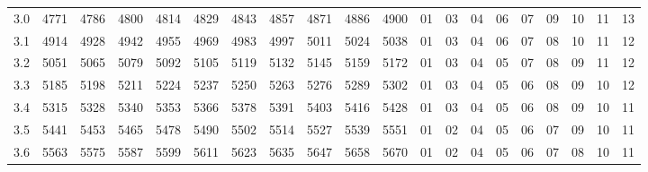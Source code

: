 \documentclass[12pt,UTF8]{ctexbook}
\begin{document}
\begin{appendix}
\begin{longtable}{|c| c c c c c | c c c c c| c c c c c c c c c|}
\scriptsize 3.0 & \scriptsize 4771 & \scriptsize 4786 & \scriptsize 4800 & \scriptsize 4814 & \scriptsize 4829 & \scriptsize 4843 & \scriptsize 4857 & \scriptsize 4871 & \scriptsize 4886 & \scriptsize 4900 & \scriptsize 01 & \scriptsize 03 & \scriptsize 04 & \scriptsize 06 & \scriptsize 07 & \scriptsize 09 & \scriptsize 10 & \scriptsize 11 & \scriptsize 13 \\
\scriptsize 3.1 & \scriptsize 4914 & \scriptsize 4928 & \scriptsize 4942 & \scriptsize 4955 & \scriptsize 4969 & \scriptsize 4983 & \scriptsize 4997 & \scriptsize 5011 & \scriptsize 5024 & \scriptsize 5038 & \scriptsize 01 & \scriptsize 03 & \scriptsize 04 & \scriptsize 06 & \scriptsize 07 & \scriptsize 08 & \scriptsize 10 & \scriptsize 11 & \scriptsize 12 \\
\scriptsize 3.2 & \scriptsize 5051 & \scriptsize 5065 & \scriptsize 5079 & \scriptsize 5092 & \scriptsize 5105 & \scriptsize 5119 & \scriptsize 5132 & \scriptsize 5145 & \scriptsize 5159 & \scriptsize 5172 & \scriptsize 01 & \scriptsize 03 & \scriptsize 04 & \scriptsize 05 & \scriptsize 07 & \scriptsize 08 & \scriptsize 09 & \scriptsize 11 & \scriptsize 12 \\
\scriptsize 3.3 & \scriptsize 5185 & \scriptsize 5198 & \scriptsize 5211 & \scriptsize 5224 & \scriptsize 5237 & \scriptsize 5250 & \scriptsize 5263 & \scriptsize 5276 & \scriptsize 5289 & \scriptsize 5302 & \scriptsize 01 & \scriptsize 03 & \scriptsize 04 & \scriptsize 05 & \scriptsize 06 & \scriptsize 08 & \scriptsize 09 & \scriptsize 10 & \scriptsize 12 \\
\scriptsize 3.4 & \scriptsize 5315 & \scriptsize 5328 & \scriptsize 5340 & \scriptsize 5353 & \scriptsize 5366 & \scriptsize 5378 & \scriptsize 5391 & \scriptsize 5403 & \scriptsize 5416 & \scriptsize 5428 & \scriptsize 01 & \scriptsize 03 & \scriptsize 04 & \scriptsize 05 & \scriptsize 06 & \scriptsize 08 & \scriptsize 09 & \scriptsize 10 & \scriptsize 11 \\
\scriptsize 3.5 & \scriptsize 5441 & \scriptsize 5453 & \scriptsize 5465 & \scriptsize 5478 & \scriptsize 5490 & \scriptsize 5502 & \scriptsize 5514 & \scriptsize 5527 & \scriptsize 5539 & \scriptsize 5551 & \scriptsize 01 & \scriptsize 02 & \scriptsize 04 & \scriptsize 05 & \scriptsize 06 & \scriptsize 07 & \scriptsize 09 & \scriptsize 10 & \scriptsize 11 \\
\scriptsize 3.6 & \scriptsize 5563 & \scriptsize 5575 & \scriptsize 5587 & \scriptsize 5599 & \scriptsize 5611 & \scriptsize 5623 & \scriptsize 5635 & \scriptsize 5647 & \scriptsize 5658 & \scriptsize 5670 & \scriptsize 01 & \scriptsize 02 & \scriptsize 04 & \scriptsize 05 & \scriptsize 06 & \scriptsize 07 & \scriptsize 08 & \scriptsize 10 & \scriptsize 11 \\

\end{longtable}
\end{appendix}
\end{document}
